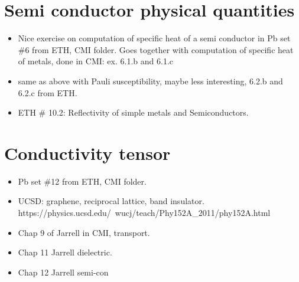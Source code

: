 \section{Semi conductor physical quantities}

\begin{itemize}
\item Nice exercise on computation of specific heat of a semi
  conductor in Pb set \#6 from ETH, CMI folder. Goes together with
  computation of specific heat of metals, done in CMI: ex. 6.1.b and
  6.1.c
\item same as above with Pauli susceptibility, maybe less interesting,
  6.2.b and 6.2.c from ETH.
\item ETH \# 10.2: Reflectivity of simple metals and Semiconductors.
\end{itemize}

\section{Conductivity tensor}

\begin{itemize}
\item Pb set \#12 from ETH, CMI folder.
\item UCSD: graphene, reciprocal lattice, band
  insulator. https://physics.ucsd.edu/~wucj/teach/Phy152A_2011/phy152A.html
\item Chap 9 of Jarrell in CMI, transport.
\item Chap 11 Jarrell dielectric.
\item Chap 12 Jarrell semi-con
\end{itemize}


